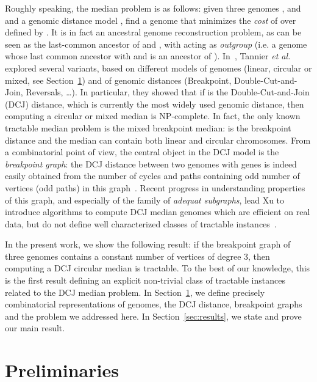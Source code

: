 \documentclass[10pt]{llncs}
\begin{document}
Roughly speaking, the median problem is as follows: given three
genomes ,  and  and a genomic distance model , find
a genome  that minimizes the \emph{cost} of  over  defined by . It is in fact an
ancestral genome reconstruction problem, as  can be seen as the
last-common ancestor of  and , with  acting as {\em
  outgroup} (i.e. a genome whose last common ancestor with  and
 is an ancestor of ). In~\cite{Tannier2009}, Tannier {\em et
  al.} explored several variants, based on different models of genomes
(linear, circular or mixed, see Section~\ref{sec:prelim}) and of
genomic distances (Breakpoint, Double-Cut-and-Join, Reversals,
\dots). In particular, they showed that if  is the
Double-Cut-and-Join (DCJ) distance, which is currently the most widely
used genomic distance, then computing a circular or mixed median is
NP-complete. In fact, the only known tractable median problem is the
mixed breakpoint median:  is the breakpoint distance and the median
can contain both linear and circular chromosomes. From a combinatorial
point of view, the central object in the DCJ model is the {\em
  breakpoint graph}: the DCJ distance between two genomes with 
genes is indeed easily obtained from the number of cycles and paths
containing odd number of vertices (odd paths) in this
graph~\cite{Yancopoulos2005,Bergeron2006}. Recent progress in
understanding properties of this graph, and especially of the family
of {\em adequat subgraphs}, lead Xu to introduce algorithms to compute
DCJ median genomes which are efficient on real data, but do not define
well characterized classes of tractable
instances~\cite{Xu2008,Xu2009a,Xu2009b,Xu2011}.

In the present work, we show the following result: if the breakpoint
graph of three genomes contains a constant number of vertices of
degree 3, then computing a DCJ circular median is tractable. To the
best of our knowledge, this is the first result defining an explicit
non-trivial class of tractable instances related to the DCJ median
problem. In Section~\ref{sec:prelim}, we define precisely
combinatorial representations of genomes, the DCJ distance, breakpoint
graphs and the problem we addressed here. In
Section~\ref{sec:results}, we state and prove our main result.





\section{Preliminaries} \label{sec:prelim}
\end{document}
